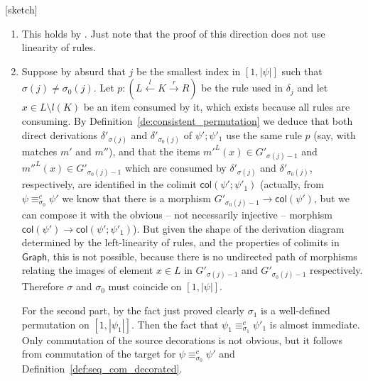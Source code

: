 \documentclass[conference]{IEEEtran}
\renewenvironment{proof}{\begin{IEEEproof}}{\end{IEEEproof}}
\newcommand{\interval}[2][1]{\ensuremath{[{#1},{#2}]}}
\newcommand{\perm}{\sigma}
\newcommand{\graph}{\ensuremath{\mathsf{Graph}}}
\newcommand{\col}[1]{\ensuremath{\mathsf{col}({#1})}}
\begin{document}
\begin{proof}{[sketch]}
\begin{enumerate}
\item This holds by  \cite[Thm. 3.5.3]{Handbook}. Just note that the proof of this direction does not use linearity of rules. 

\item Suppose by absurd that  $j$ be the smallest index in $\interval{|\psi|}$ such that 
$\perm(j) \not =  \perm_0(j)$. Let  $p : (L \stackrel{l}{\leftarrow} K \stackrel{r}{\rightarrow} R)$ be the 
rule used in $\delta_j$ and let 
$x \in L \setminus{l(K)}$ be an item consumed by it, which exists because all rules are consuming. 
By Definition~\ref{de:consistent_permutation} we deduce that both direct derivations $\delta'_{\perm(j)}$
and $\delta'_{\perm_0(j)}$ of $\psi';\psi'_1$ use the same rule $p$ (say, with matches $m'$ and $m''$), 
and that 
the items ${m'}^L(x) \in G'_{\perm(j)-1}$ and 
${m''}^L(x) \in G'_{\perm_0(j)-1}$ which are consumed by $\delta'_{\perm(j)}$ and $\delta'_{\perm_0(j)}$, 
respectively, are identified in the colimit $\col{\psi';\psi'_1}$ (actually, from $\psi  \equiv^{c}_{\perm_0} \psi'$
we know that there is a morphism $G'_{\perm_0(j)-1} \to \col{\psi'}$, but we can compose it with 
the obvious -- not necessarily injective -- morphism  $\col{\psi'} \to  \col{\psi';\psi'_1}$).
 But given the shape of the derivation diagram determined
by the left-linearity of rules, and the 
properties of colimits in $\graph$, this is not possible, because there is no undirected path of morphisms 
relating the images of element $x \in L$ in  $G'_{\perm(j)-1}$ and $G'_{\perm_0(j)-1}$ respectively.
Therefore $\perm$ and $\perm_0$ must coincide on $\interval{|\psi|}$.

For the second part, by the fact just proved clearly $\perm_1$ is a
well-defined permutation on $\interval{|\psi_1|}$. Then the fact that
$\psi_1 \equiv^{c}_{\perm_1} \psi'_1$ is almost immediate. Only
commutation of the source decorations is not obvious, but it follows
from commutation of the target for $\psi \equiv^{c}_{\perm_0} \psi'$
and Definition~\ref{def:seq_com_decorated}.


\end{enumerate}
\end{proof}
\end{document}
